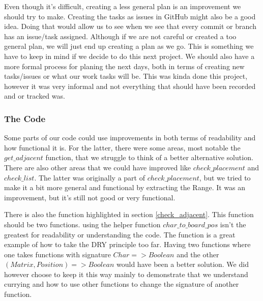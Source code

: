 \documentclass[12pt]{article}
\begin{document}
Even though it's difficult, creating a less general plan is an improvement we should try to make. Creating the tasks as issues in GitHub  might also be a good idea. Doing that would allow us to see when we see that every commit or branch has an issue/task assigned. Although if we are not careful or created a too general plan, we will just end up creating a plan as we go. This is something we have to keep in mind if we decide to do this next project. We should also have a more formal process for planing the next days, both in terms of creating new tasks/issues or what our work tasks will be. This was kinda done this project, however it was very informal and not everything that should have been recorded and or tracked was.


\subsubsection{The Code}
Some parts of our code could use improvements in both terms of readability and how functional it is. For the latter, there were some areas, most notable the $get\_adjacent$ function, that we struggle to think of a better alternative solution. There are also other areas that we could have improved like $check\_placement$ and $check\_list$. The latter was originally a part of $check\_placement$, but we tried to make it a bit more general and functional by extracting the Range. It was an improvement, but it's still not good or very functional.

There is also the function highlighted in section \ref{check_adjacent}. This function should be two functions. using the helper function $char\_to\_board\_pos$ isn't the greatest for readability or understanding the code. The function is a great example of how to take the DRY principle too far. Having two functions where one takes functions with signature $Char => Boolean$ and the other $(Matrix, Position) => Boolean$ would have been a better solution. We did however choose to keep it this way mainly to demonstrate that we understand currying and how to use other functions to change the signature of another function.

\end{document}
